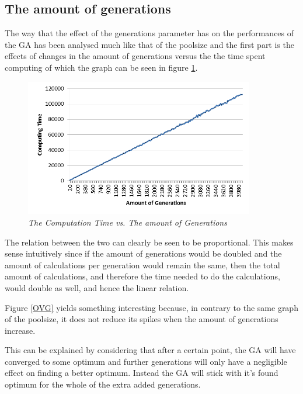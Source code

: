 \subsection{The amount of generations}

\par
The way that the effect of the generations parameter has on the performances of the GA has been analysed much like that of the poolsize and the first part is the effects of changes in the amount of generations versus the the time spent computing of which the graph can be seen in figure \ref{CTG}.

\begin{figure}[h] 
	\centering
	\includegraphics[height=6cm]{CTG}
	\caption{\textsl{The Computation Time vs. The amount of Generations}}
	\label{CTG}
\end{figure}

\par
The relation between the two can clearly be seen to be proportional. This makes sense intuitively since if the amount of generations would be doubled and the amount of calculations per generation would remain the same, then the total amount of calculations, and therefore the time needed to do the calculations, would double as well, and hence the linear relation.

Figure \ref{OVG} yields something interesting because, in contrary to the same graph of the poolsize, it does not reduce its spikes when the amount of generations increase.

\par
This can be explained by considering that after a certain point, the GA will have converged to some optimum and further generations will only have a negligible effect on finding a better optimum. Instead the GA will stick with it’s found optimum for the whole of the extra added generations.



